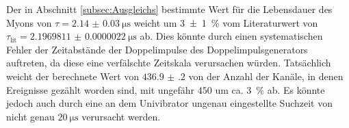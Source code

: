 Der in Abschnitt \ref{subsec:Ausgleichs} bestimmte Wert für die Lebensdauer des Myons von $\tau=\SI{2.14(3)}{\micro\second}$ weicht um \SI{3(1)}{\percent} vom Literaturwert von $\tau_\text{lit}=\SI{2.1969811(22)}{\micro\second}$ \cite{ParticlePhysics} ab. Dies könnte durch einen systematischen Fehler der Zeitabstände der Doppelimpulse des Doppelimpulsgenerators auftreten, da diese eine verfälschte Zeitskala verursachen würden. Tatsächlich weicht der berechnete Wert von $\num{436.9(2)}$ von der Anzahl der Kanäle, in denen Ereignisse gezählt worden sind, mit ungefähr $450$ um ca. \SI{3}{\percent} ab. 
Es könnte jedoch auch durch eine an dem Univibrator ungenau eingestellte Suchzeit von nicht genau $\SI{20}{\micro\second}$ verursacht werden.




